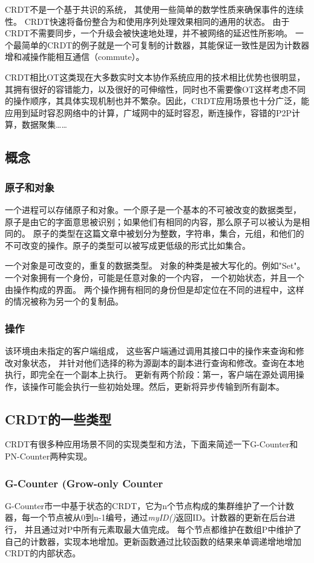 \documentclass[11pt]{ctexart}
\begin{document}
CRDT不是一个基于共识的系统，
其使用一些简单的数学性质来确保事件的连续性。
CRDT快速将备份整合为和使用序列处理效果相同的通用的状态。
由于CRDT不需要同步，一个升级会被快速地处理，并不被网络的延迟性所影响。
一个最简单的CRDT的例子就是一个可复制的计数器，其能保证一致性是因为计数器增和减操作能相互通信（commute）。

CRDT相比OT这类现在大多数实时文本协作系统应用的技术相比优势也很明显，其拥有很好的容错能力，以及很好的可伸缩性，同时也不需要像OT这样考虑不同的操作顺序，其具体实现机制也并不繁杂。因此，CRDT应用场景也十分广泛，能应用到延时容忍网络中的计算，广域网中的延时容忍，断连操作，容错的P2P计算，数据聚集……

\subsection{概念}
\subsubsection{原子和对象}
一个进程可以存储原子和对象。一个原子是一个基本的不可被改变的数据类型，
原子是由它的字面意思被识别；如果他们有相同的内容，那么原子可以被认为是相同的。
原子的类型在这篇文章中被划分为整数，字符串，集合，元组，和他们的不可改变的操作。原子的类型可以被写成更低级的形式比如集合。

一个对象是可改变的，重复的数据类型。
对象的种类是被大写化的。例如"Set"。
一个对象拥有一个身份，可能是任意对象的一个内容，
一个初始状态，并且一个由操作构成的界面。
两个操作拥有相同的身份但是却定位在不同的进程中，这样的情况被称为另一个的复制品。

\subsubsection{操作}
该环境由未指定的客户端组成，
这些客户端通过调用其接口中的操作来查询和修改对象状态，
并针对他们选择的称为源副本的副本进行查询和修改。查询在本地执行，即完全在一个副本上执行。
更新有两个阶段：第一，客户端在源处调用操作，该操作可能会执行一些初始处理。然后，更新将异步传输到所有副本。

\subsection{CRDT的一些类型}
CRDT有很多种应用场景不同的实现类型和方法，下面来简述一下G-Counter和PN-Counter两种实现。
\subsubsection{G-Counter (Grow-only Counter}
G-Counter市一中基于状态的CRDT，它为n个节点构成的集群维护了一个计数器，每一个节点被从0到n-1编号，通过\textit{myID()}返回ID。计数器的更新在后台进行，
并且通过对P中所有元素取最大值完成。
每个节点都维护在数组P中维护了自己的计数器，实现本地增加。更新函数通过比较函数的结果来单调递增地增加CRDT的内部状态。
\end{document}
